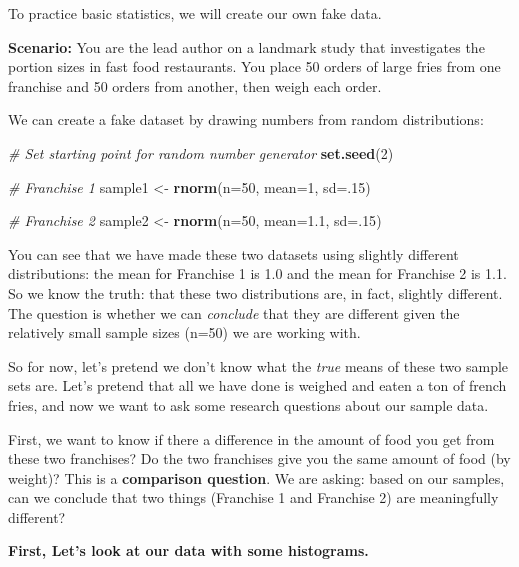 \documentclass[]{book}
\newenvironment{Shaded}{\begin{snugshade}}{\end{snugshade}}
\newcommand{\CommentTok}[1]{\textcolor[rgb]{0.56,0.35,0.01}{\textit{#1}}}
\newcommand{\DataTypeTok}[1]{\textcolor[rgb]{0.13,0.29,0.53}{#1}}
\newcommand{\DecValTok}[1]{\textcolor[rgb]{0.00,0.00,0.81}{#1}}
\newcommand{\FloatTok}[1]{\textcolor[rgb]{0.00,0.00,0.81}{#1}}
\newcommand{\KeywordTok}[1]{\textcolor[rgb]{0.13,0.29,0.53}{\textbf{#1}}}
\newcommand{\NormalTok}[1]{#1}
\newcommand{\StringTok}[1]{\textcolor[rgb]{0.31,0.60,0.02}{#1}}
\begin{document}
To practice basic statistics, we will create our own fake data.

\textbf{Scenario:} You are the lead author on a landmark study that investigates the portion sizes in fast food restaurants. You place 50 orders of large fries from one franchise and 50 orders from another, then weigh each order.

We can create a fake dataset by drawing numbers from random distributions:

\begin{Shaded}
\begin{Highlighting}[]
\CommentTok{# Set starting point for random number generator}
\KeywordTok{set.seed}\NormalTok{(}\DecValTok{2}\NormalTok{)}

\CommentTok{# Franchise 1}
\NormalTok{sample1 <-}\StringTok{ }\KeywordTok{rnorm}\NormalTok{(}\DataTypeTok{n=}\DecValTok{50}\NormalTok{, }\DataTypeTok{mean=}\DecValTok{1}\NormalTok{, }\DataTypeTok{sd=}\NormalTok{.}\DecValTok{15}\NormalTok{)}

\CommentTok{# Franchise 2}
\NormalTok{sample2 <-}\StringTok{ }\KeywordTok{rnorm}\NormalTok{(}\DataTypeTok{n=}\DecValTok{50}\NormalTok{, }\DataTypeTok{mean=}\FloatTok{1.1}\NormalTok{, }\DataTypeTok{sd=}\NormalTok{.}\DecValTok{15}\NormalTok{)}
\end{Highlighting}
\end{Shaded}

You can see that we have made these two datasets using slightly different distributions: the mean for Franchise 1 is 1.0 and the mean for Franchise 2 is 1.1. So we know the truth: that these two distributions are, in fact, slightly different. The question is whether we can \emph{conclude} that they are different given the relatively small sample sizes (n=50) we are working with.

So for now, let's pretend we don't know what the \emph{true} means of these two sample sets are. Let's pretend that all we have done is weighed and eaten a ton of french fries, and now we want to ask some research questions about our sample data.

First, we want to know if there a difference in the amount of food you get from these two franchises? Do the two franchises give you the same amount of food (by weight)? This is a \textbf{comparison question}. We are asking: based on our samples, can we conclude that two things (Franchise 1 and Franchise 2) are meaningfully different?

\textbf{First, Let's look at our data with some histograms.}
\end{document}
